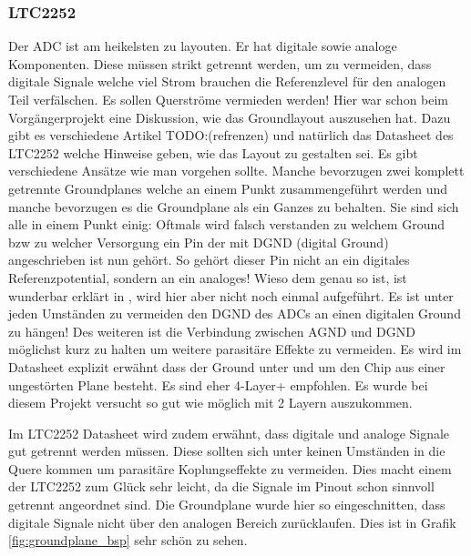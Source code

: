 \subsubsection*{LTC2252}
Der ADC ist am heikelsten zu layouten. Er hat digitale sowie analoge Komponenten. Diese müssen strikt getrennt werden, um zu vermeiden, dass digitale Signale welche viel Strom brauchen die Referenzlevel für den analogen Teil verfälschen. Es sollen Querströme vermieden werden!
Hier war schon beim Vorgängerprojekt eine Diskussion, wie das Groundlayout auszusehen hat. Dazu gibt es verschiedene Artikel TODO:(refrenzen) und natürlich das Datasheet des LTC2252 welche Hinweise geben, wie das Layout zu gestalten sei. Es gibt verschiedene Ansätze wie man vorgehen sollte. Manche bevorzugen zwei komplett getrennte Groundplanes welche an einem Punkt zusammengeführt werden und manche bevorzugen es die Groundplane als ein Ganzes zu behalten. Sie sind sich alle in einem Punkt einig: Oftmals wird falsch verstanden zu welchem Ground bzw zu welcher Versorgung ein Pin der mit DGND (digital Ground) angeschrieben ist nun gehört. So gehört dieser Pin nicht an ein digitales Referenzpotential, sondern an ein analoges! Wieso dem genau so ist, ist wunderbar erklärt in \cite{StayingWellGrounded2012}, wird hier aber nicht noch einmal aufgeführt.
Es ist unter jeden Umständen zu vermeiden den DGND des ADCs an einen digitalen Ground zu hängen! Des weiteren ist die Verbindung zwischen AGND und DGND möglichst kurz zu halten um weitere parasitäre Effekte zu vermeiden.
Es wird im Datasheet explizit erwähnt dass der Ground unter und um den Chip aus einer ungestörten Plane besteht. Es sind eher 4-Layer+ empfohlen. Es wurde bei diesem Projekt versucht so gut wie möglich mit 2 Layern auszukommen.

Im LTC2252 Datasheet wird zudem erwähnt, dass digitale und analoge Signale gut getrennt werden müssen. Diese sollten sich unter keinen Umständen in die Quere kommen um parasitäre Koplungseffekte zu vermeiden. Dies macht einem der LTC2252 zum Glück sehr leicht, da die Signale im Pinout schon sinnvoll getrennt angeordnet sind.
Die Groundplane wurde hier so eingeschnitten, dass digitale Signale nicht über den analogen Bereich zurücklaufen. Dies ist in Grafik \ref{fig:groundplane_bsp} sehr schön zu sehen.

